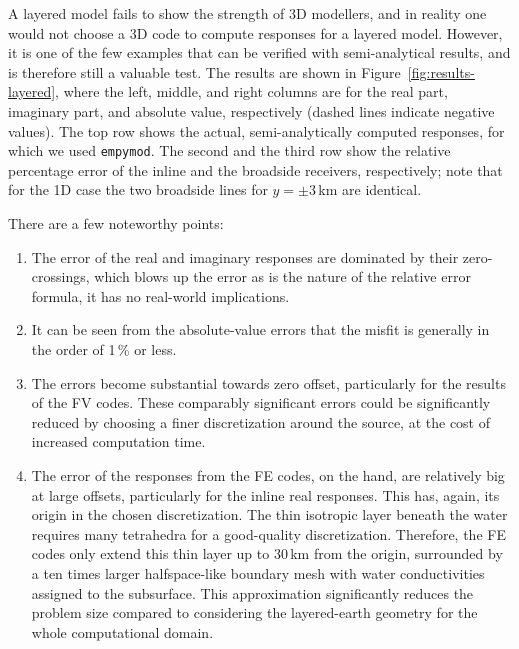 \documentclass[
    paper,
  ]{geophysics}
\newcommand{\empymod}{\texttt{empymod}\xspace}
\begin{document}
A layered model fails to show the strength of 3D modellers, and in reality one would not choose a 3D code to compute responses for a layered model. However, it is one of the few examples that can be verified with semi-analytical results, and is therefore still a valuable test. The results are shown in Figure~\ref{fig:results-layered}, where the left, middle, and right columns are for the real part, imaginary part, and absolute value, respectively (dashed lines indicate negative values). The top row shows the actual, semi-analytically computed responses, for which we used \empymod\citep{GEO.17.Werthmuller}. The second and the third row show the relative percentage error of the inline and the broadside receivers, respectively; note that for the 1D case the two broadside lines for $y=\pm3\,$km are identical.

%
%

There are a few noteworthy points:
\begin{enumerate}
  \item The error of the real and imaginary responses are dominated by their zero-crossings, which blows up the error as is the nature of the relative error formula, it has no real-world implications.
  \item It can be seen from the absolute-value errors that the misfit is generally in the order of 1\,\% or less.
  \item The errors become substantial towards zero offset, particularly for the results of the FV codes. These comparably significant errors could be significantly reduced by choosing a finer discretization around the source, at the cost of increased computation time.
  \item The error of the responses from the FE codes, on the hand, are relatively big at large offsets, particularly for the inline real responses. This has, again, its origin in the chosen discretization. The thin isotropic layer beneath the water requires many tetrahedra for a good-quality discretization. Therefore, the FE codes only extend this thin layer up to 30\,km from the origin, surrounded by a ten times larger halfspace-like boundary mesh with water conductivities assigned to the subsurface. This approximation significantly reduces the problem size compared to considering the layered-earth geometry for the whole computational domain.
\end{enumerate}
\end{document}
